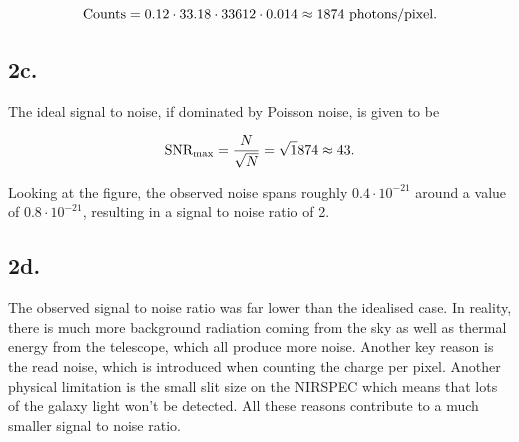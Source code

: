 \documentclass{article}
\begin{document}
\begin{equation*}
    \textup{Counts}=0.12\cdot33.18\cdot33612\cdot0.014\approx1874\textup{ photons/pixel}.
\end{equation*}

\subsection*{2c.}
The ideal signal to noise, if dominated by Poisson noise, is given to be

\begin{equation*}
    \textup{SNR}_\textup{max}=\frac{N}{\sqrt{N}}=\sqrt 1874\approx43.
\end{equation*}

Looking at the figure, the observed noise spans roughly $0.4\cdot10^{-21}$ around a value of $0.8\cdot10^{-21}$, resulting in a signal to noise ratio of 2.

\subsection*{2d.}
The observed signal to noise ratio was far lower than the idealised case. In reality, there is much more background radiation coming from the sky as well as thermal energy from the telescope, which all produce more noise. Another key reason is the read noise, which is introduced when counting the charge per pixel. Another physical limitation is the small slit size on the NIRSPEC which means that lots of the galaxy light won't be detected. All these reasons contribute to a much smaller signal to noise ratio.
\end{document}
